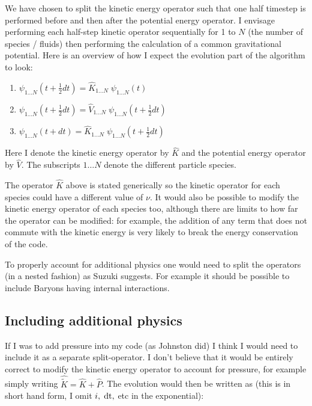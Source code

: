 \noindent We have chosen to split the kinetic energy operator such that one half timestep is performed before and then after the potential energy operator. I envisage performing each half-step kinetic operator sequentially for 1 to $N$ (the number of species / fluids) then performing the calculation of a common gravitational potential. Here is an overview of how I expect the evolution part of the algorithm to look:

\begin{enumerate}
\item $\psi_{1 \ldots N}(t + \frac{1}{2} dt) = \hat{K}_{1 \ldots N} \; \psi_{1 \ldots N} (t)$
\item $\psi_{1 \ldots N}(t + \frac{1}{2} dt) = \hat{V}_{1 \ldots N} \; \psi_{1 \ldots N} (t + \frac{1}{2} dt)$
\item $\psi_{1 \ldots N}(t + dt) = \hat{K}_{1 \ldots N} \; \psi_{1 \ldots N} (t + \frac{1}{2} dt)$
\end{enumerate}

\noindent Here I denote the kinetic energy operator by $\hat{K}$ and the potential energy operator by $\hat{V}$. The subscripts ${1 \ldots N}$ denote the different particle species.

The operator $\hat{K}$ above is stated generically so the kinetic operator for each species could have a different value of $\nu$. It would also be possible to modify the kinetic energy operator of each species too, although there are limits to how far the operator can be modified: for example, the addition of any term that does not commute with the kinetic energy is very likely to break the energy conservation of the code.

To properly account for additional physics one would need to split the operators (in a nested fashion) as Suzuki suggests. For example it should be possible to include Baryons having internal interactions.

\subsection{Including additional physics}
\label{addphys}
If I was to add pressure into my code (as Johnston did) I think I would need to include it as a separate split-operator. I don't believe that it would be entirely correct to modify the kinetic energy operator to account for pressure, for example simply writing $\hat{\tilde{K}} = \hat{K} + \hat{P}$. The evolution would then be written as (this is in short hand form, I omit $i, \; {\rm dt},$ etc in the exponential):

